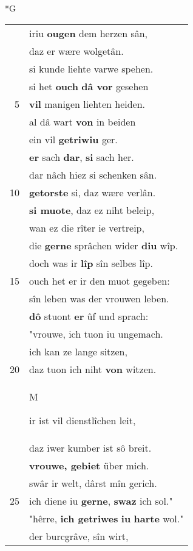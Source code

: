 \documentclass[8pt,a4paper,notitlepage]{article}
\begin{document}
\newpage
\begin{table}[ht]
\begin{minipage}[t]{0.5\linewidth}
\small
\begin{center}*G
\end{center}
\begin{tabular}{rl}
 & iriu \textbf{ougen} dem herzen sân,\\ 
 & daz er wære wolgetân.\\ 
 & si kunde liehte varwe spehen.\\ 
 & si het \textbf{ouch} \textbf{dâ vor} gesehen\\ 
5 & \textbf{vil} manigen liehten heiden.\\ 
 & al dâ wart \textbf{von} in beiden\\ 
 & ein vil \textbf{getriwiu} ger.\\ 
 & \textbf{er} sach \textbf{dar}, \textbf{si} sach her.\\ 
 & dar nâch hiez si schenken sân.\\ 
10 & \textbf{getorste} si, daz wære verlân.\\ 
 & \textbf{si muote}, daz ez niht beleip,\\ 
 & wan ez die rîter ie vertreip,\\ 
 & die \textbf{gerne} sprâchen wider \textbf{diu} wîp.\\ 
 & doch was ir \textbf{lîp} sîn selbes lîp.\\ 
15 & ouch het er ir den muot gegeben:\\ 
 & sîn leben was der vrouwen leben.\\ 
 & \textbf{dô} stuont \textbf{er} ûf und sprach:\\ 
 & "vrouwe, ich tuon iu ungemach.\\ 
 & ich kan ze lange sitzen,\\ 
20 & daz tuon ich niht \textbf{von} witzen.\\ 
 & \begin{large}M\end{large}ir ist vil dienstlîchen leit,\\ 
 & daz iwer kumber ist sô breit.\\ 
 & \textbf{vrouwe, gebiet} über mich.\\ 
 & swâr ir welt, dârst mîn gerich.\\ 
25 & ich diene iu \textbf{gerne}, \textbf{swaz} ich sol."\\ 
 & "hêrre, \textbf{ich getriwes} \textbf{iu} \textbf{harte} wol."\\ 
 & der burcgrâve, sîn wirt,\\ 

\end{tabular}
\end{minipage}
\end{table}
\end{document}
